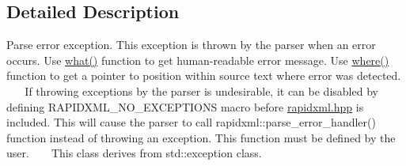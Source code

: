 \subsection{Detailed Description}
Parse error exception. This exception is thrown by the parser when an error occurs. Use \hyperlink{classrapidxml_1_1parse__error_a7665c88639e7466ee1de388a4f85e6fe}{what()} function to get human-\/readable error message. Use \hyperlink{classrapidxml_1_1parse__error_a3a0ab9e586c1d2b437c340f6622fbec6}{where()} function to get a pointer to position within source text where error was detected. ~\newline
~\newline
 If throwing exceptions by the parser is undesirable, it can be disabled by defining R\+A\+P\+I\+D\+X\+M\+L\+\_\+\+N\+O\+\_\+\+E\+X\+C\+E\+P\+T\+I\+O\+N\+S macro before \hyperlink{rapidxml_8hpp}{rapidxml.\+hpp} is included. This will cause the parser to call rapidxml\+::parse\+\_\+error\+\_\+handler() function instead of throwing an exception. This function must be defined by the user. ~\newline
~\newline
 This class derives from {\ttfamily std\+::exception} class. 

